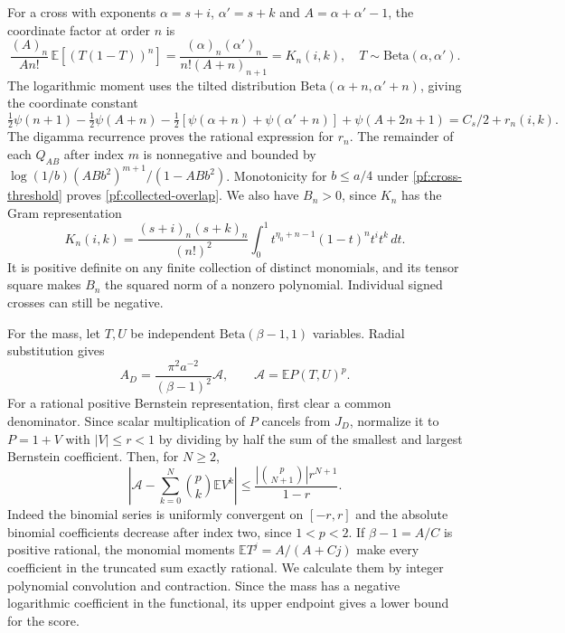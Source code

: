For a cross with exponents $\alpha=s+i$, $\alpha'=s+k$ and
$A=\alpha+\alpha'-1$, the coordinate factor at order $n$ is
\[
 \frac{(A)_n}{A n!}\,
 \mathbb E[(T(1-T))^n]
 =\frac{(\alpha)_n(\alpha')_n}
 {n!(A+n)_{n+1}}=K_n(i,k),\quad
 T\sim\mathrm{Beta}(\alpha,\alpha').
\]
The logarithmic moment uses the tilted distribution
$\mathrm{Beta}(\alpha+n,\alpha'+n)$, giving the coordinate constant
\[
 \tfrac12\psi(n+1)-\tfrac12\psi(A+n)
 -\tfrac12[\psi(\alpha+n)+\psi(\alpha'+n)]
 +\psi(A+2n+1)=C_s/2+r_n(i,k).
\]
The digamma recurrence proves the rational expression for $r_n$.
The remainder of each $Q_{AB}$ after index $m$ is nonnegative and bounded
by $\log(1/b)(ABb^2)^{m+1}/(1-ABb^2)$. Monotonicity for $b\le a/4$
under \eqref{pf:cross-threshold} proves \eqref{pf:collected-overlap}.
We also have $B_n>0$, since $K_n$ has the Gram representation
\[
 K_n(i,k)=\frac{(s+i)_n(s+k)_n}{(n!)^2}
 \int_0^1 t^{\eta_0+n-1}(1-t)^n t^i t^k\,dt.
\]
It is positive definite on any finite collection of distinct monomials,
and its tensor square makes $B_n$ the squared norm of a nonzero
polynomial. Individual signed crosses can still be negative.

For the mass, let $T,U$ be independent $\mathrm{Beta}(\beta-1,1)$ variables.
Radial substitution gives
\begin{equation}\label{pf:polynomial-mass}
 A_D=\frac{\pi^2a^{-2}}{(\beta-1)^2}\mathcal A,
 \qquad \mathcal A=\mathbb E P(T,U)^p.
\end{equation}
For a rational positive Bernstein representation, first clear a common
denominator. Since scalar multiplication of $P$ cancels from $J_D$, normalize
it to $P=1+V$ with $|V|\le r<1$ by dividing by half the sum of the smallest
and largest Bernstein coefficient. Then, for $N\ge2$,
\begin{equation}\label{pf:polynomial-mass-tail}
 \left|\mathcal A-\sum_{k=0}^N\binom pk\mathbb EV^k\right|
 \le\frac{|\binom p{N+1}|r^{N+1}}{1-r}.
\end{equation}
Indeed the binomial series is uniformly convergent on $[-r,r]$ and the
absolute binomial coefficients decrease after index two, since
$1<p<2$. If $\beta-1=A/C$ is positive rational, the monomial moments
$\mathbb ET^j=A/(A+Cj)$ make every coefficient in the truncated sum
exactly rational. We calculate them by integer polynomial convolution
and contraction. Since the mass has a negative logarithmic coefficient
in the functional, its upper endpoint gives a lower bound for the score.


